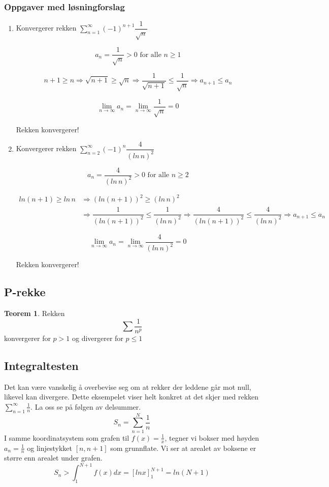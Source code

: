 \documentclass[11pt]{article}
\theoremstyle{definition}
\theoremstyle{definition}
\theoremstyle{definition}
\theoremstyle{definition}
\newtheorem{teo}{Teorem}[section]
\newenvironment{fteo}
{\begin{mdframed}[style=minstil]\begin{teo}}
		{\end{teo}\end{mdframed}}
\theoremstyle{definition}
\theoremstyle{definition}
\begin{document}
		\newpage
		
		\subsubsection{Oppgaver med løsningforslag}
		
		
		\begin{enumerate}
			\item Konvergerer rekken \(\sum_{n=1}^{\infty}(-1)^{n+1}\dfrac{1}{\sqrt{n}} \)
		 
		 \[a_n=\dfrac{1}{\sqrt{n}} > 0 \text{ for alle } n\geq 1 \]
		 
		 \[ n+1 \geq n \Rightarrow \sqrt{n+1} \geq \sqrt{n} \Rightarrow \frac{1}{\sqrt{n+1}} \leq\frac{1}{\sqrt{n}} \Rightarrow a_{n+1} \leq a_n \]
		 
		 \[\lim\limits_{n\rightarrow \infty}a_n = \lim\limits_{n\rightarrow \infty} \frac{1}{\sqrt{n}}=0\]
		 
		 Rekken konvergerer!
		
		
		\item Konvergerer rekken \(\sum_{n=2}^{\infty}(-1)^{n}\dfrac{4}{(ln\,n)^2}\)
		
		\[a_n = \dfrac{4}{(ln\,n)^2}>0 \text{ for alle } n\geq 2 \]
		
		\begin{align*}
		ln(n+1)\geq ln\,n &\Rightarrow (ln(n+1))^2 \geq (ln\,n)^2 \\ &\Rightarrow \dfrac{1}{(ln(n+1))^2} \leq \dfrac{1}{(ln\,n)^2} \Rightarrow \dfrac{4}{(ln(n+1))^2} \leq \dfrac{4}{(ln\,n)^2} \Rightarrow a_{n+1}\leq a_n 
		\end{align*}
		
		\[\lim\limits_{n\rightarrow \infty}a_n=\lim\limits_{n\rightarrow \infty}\dfrac{4}{(ln\,n)^2}=0 \]
		
		Rekken konvergerer!
		\end{enumerate}
		
		\newpage
		
		\subsection{P-rekke}
		
		\begin{fteo}
			Rekken \[\sum \dfrac{1}{n^p}\]
			konvergerer for \(p>1\) og divergerer for \(p\leq 1\)
		\end{fteo}
		
		\newpage

		 
		 \subsection{Integraltesten}
		 Det kan være vanskelig å overbevise seg om at rekker der leddene går mot null, likevel kan divergere. Dette eksempelet viser helt konkret at det skjer med rekken \(\displaystyle{\sum_{n=1}^{\infty}\frac{1}{n}}\). La oss se på følgen av delsummer. 
		 \[S_n=\sum_{n=1}^{N}\frac{1}{n}\]
		 I samme koordinatsystem som grafen til \(f(x)=\tfrac{1}{x}\), tegner vi bokser med høyden \(a_n=\tfrac{1}{n}\) og linjestykket \([n,n+1] \) som grunnflate. Vi ser at arealet av boksene er større enn arealet under grafen.
		 \[S_n>\int_{1}^{N+1}f(x)dx=[lnx]_{1}^{N+1}=ln(N+1) \]
        
\end{document}
